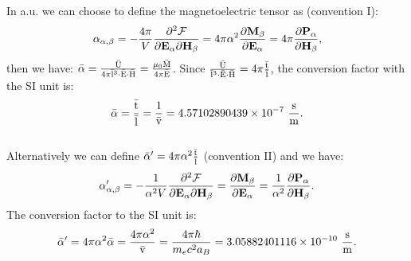 \documentclass[12pt,a4paper,twoside]{report}
\def\baralpha{4.57102890439\times 10^{-7}}
\def\baralphap{3.05882401116\times 10^{-10}}
\begin{document}
{\color{web-blue} 

In a.u. we can choose to define the magnetoelectric tensor as (convention I):
\begin{equation}
\alpha_{\alpha,\beta}=-{4 \pi\over V} {\partial^2 \mathcal{F} \over \partial 
{\bf E}_{\alpha} \partial {\bf H}_{\beta}}= 4 \pi \alpha^2 {\partial {\bf M}_{\beta} \over \partial {\bf E}_{\alpha}}= 4 \pi
{\partial {\bf P}_{\alpha} \over \partial {\bf H}_{\beta}}, 
\end{equation}
then we have: $\bar \alpha=
{{\rm \bar U} \over 4 \pi {\rm \bar l}^3\cdot {\rm \bar E}\cdot {\rm \bar H}}={\mu_0 {\rm \bar M} \over 4 \pi {\rm \bar E}}$.
Since
${{\rm \bar U} \over {\rm \bar l}^3 \cdot {\rm \bar E} \cdot {\rm \bar H}}=
4 \pi {{\rm \bar t} \over {\rm \bar l} }$, 
the conversion factor with the SI unit is:
\begin{equation}
{\rm \bar \alpha} = {{\rm \bar t} \over {\rm \bar l}} = {1\over {\rm \bar v}}=\baralpha\ {{\rm s} \over {\rm m}}.
\end{equation}
\\
Alternatively we can define $\bar \alpha'=4 \pi \alpha^2 {{\rm \bar t} \over {\rm \bar l}}$ 
(convention II) and we have:
\begin{equation}
\alpha'_{\alpha,\beta}=-{1 \over \alpha^2 V} 
{\partial^2 \mathcal{F} \over \partial {\bf E}_{\alpha} 
\partial {\bf H}_{\beta}}= {\partial {\bf M}_{\beta} \over 
\partial {\bf E}_{\alpha}}= {1\over \alpha^2}
{\partial {\bf P}_{\alpha} \over \partial {\bf H}_{\beta}}. 
\end{equation}
The conversion factor to the SI unit is: 
\begin{equation}
\bar \alpha'= 4 \pi \alpha^2 \bar \alpha = {4 \pi \alpha^2\over {\rm \bar v}}
={4 \pi \hbar \over m_e c^2 a_B}
=\baralphap\ {{\rm s} \over {\rm m}}.
\end{equation}
}
\\
\end{document}
